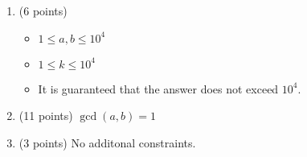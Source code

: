 \begin{enumerate}
    \tightlist
    \item (6 points) \begin{itemize}
        \item $1 \leq a,b \leq 10^4$
        \item $1 \leq k \leq 10^4$
        \item It is guaranteed that the answer does not exceed $10^{4}$.
    \end{itemize}
    \item (11 points) $\gcd(a, b) = 1$
    \item (3 points) No additonal constraints.
\end{enumerate}
    